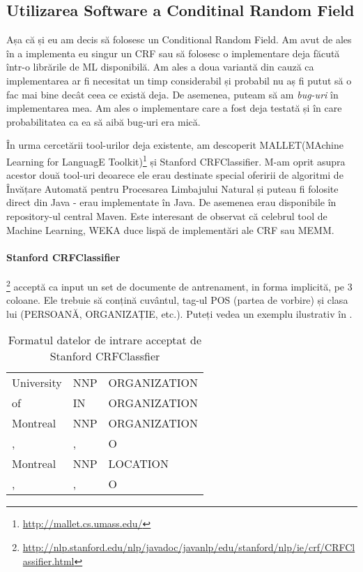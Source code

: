\subsection{Utilizarea Software a Conditinal Random Field}
\label{sub-sec:crf-software}

Așa că și eu am decis să folosesc un Conditional Random Field. Am avut de ales în a implementa eu singur un CRF sau să folosesc o implementare deja făcută într-o librările de ML disponibilă. Am ales a doua variantă din cauză ca implementarea ar fi necesitat un timp considerabil și probabil nu aș fi putut să o fac mai bine decât ceea ce există deja. De asemenea, puteam să am \textit{bug-uri} în implementarea mea. Am ales o implementare care a fost deja testată și în care probabilitatea ca ea să aibă bug-uri era mică.


În urma cercetării tool-urilor deja existente, am descoperit MALLET(MAchine Learning for LanguagE Toolkit)\footnote{\url{http://mallet.cs.umass.edu/}} și Stanford CRFClassifier. M-am oprit asupra acestor două tool-uri deoarece ele erau destinate special oferirii de algoritmi de Învățare Automată pentru Procesarea Limbajului Natural și puteau fi folosite direct din Java - erau implementate în Java. De asemenea erau disponibile în repository-ul central Maven. Este interesant de observat că celebrul tool de Machine Learning, WEKA duce lispă de implementări ale CRF sau MEMM. 


\paragraph{Stanford CRFClassifier}\footnote{\url{http://nlp.stanford.edu/nlp/javadoc/javanlp/edu/stanford/nlp/ie/crf/CRFClassifier.html}} acceptă ca input un set de documente de antrenament, in forma implicită, pe 3 coloane. Ele trebuie să conțină cuvântul, tag-ul POS (partea de vorbire) și clasa lui (PERSOANĂ, ORGANIZAȚIE, etc.). Puteți vedea un exemplu ilustrativ în .

\begin{center}
\begin{table}[htb]
  \caption{Formatul datelor de intrare acceptat de Stanford CRFClassfier}
  \begin{tabular}{l l l}
   University & NNP & ORGANIZATION \\
   of & IN & ORGANIZATION \\
   Montreal & NNP & ORGANIZATION \\
   ,& , & O \\
   Montreal & NNP & LOCATION\\
   ,& ,& O\\
  \end{tabular}
  \label{table:input-crf}
\end{table}
\end{center}

